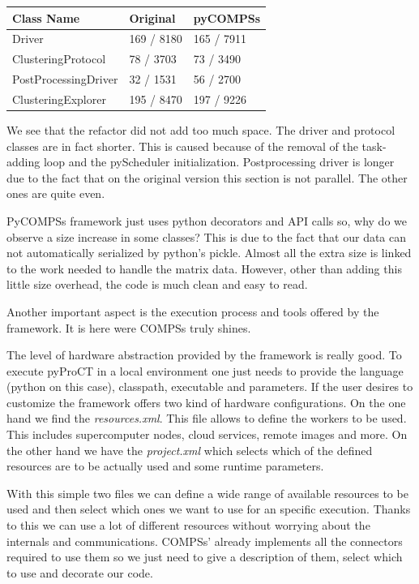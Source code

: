 \begin{center}
	\begin{tabular}{| R{6cm} | L{3cm} | L{3cm} |}
		\hline
		Class Name & Original & pyCOMPSs \\ 
		\hline
		\hline
		Driver & 169 / 8180  &  165 / 7911 \\
		\hline
		ClusteringProtocol & 78 / 3703 & 73 / 3490 \\
		\hline
		PostProcessingDriver & 32 / 1531 & 56 / 2700 \\
		\hline
		ClusteringExplorer & 195 / 8470 & 197 / 9226 \\ 
		\hline
	\end{tabular}
	\label{tab:sizes}
\end{center}


We see that the refactor did not add too much space. The driver and protocol classes are in fact shorter. This is caused because of the removal of the task-adding loop and the pyScheduler initialization. Postprocessing driver is longer due to the fact that on the original version this section is not parallel. The other ones are quite even.

PyCOMPSs framework just uses python decorators and API calls so, why do we observe a size increase in some classes? This is due to the fact that our data can not automatically serialized by python's pickle. Almost all the extra size is linked to the work needed to handle the matrix data. However, other than adding this little size overhead, the code is much clean and easy to read. 

Another important aspect is the execution process and tools offered by the framework. It is here were COMPSs truly shines. 

The level of hardware abstraction provided by the framework is really good. To execute pyProCT in a local environment one just needs to provide the language (python on this case), classpath, executable and parameters. If the user desires to customize the framework offers two kind of hardware configurations. On the one hand we find the \textit{resources.xml}. This file allows to define the workers to be used. This includes supercomputer nodes, cloud services, remote images and more. On the other hand we have the \textit{project.xml} which selects which of the defined resources are to be actually used and some runtime parameters. 

With this simple two files we can define a wide range of available resources to be used and then select which ones we want to use for an specific execution. Thanks to this we can use a lot of different resources without worrying about the internals and communications. COMPSs' already implements all the connectors required to use them so we just need to give a description of them, select which to use and decorate our code. 

